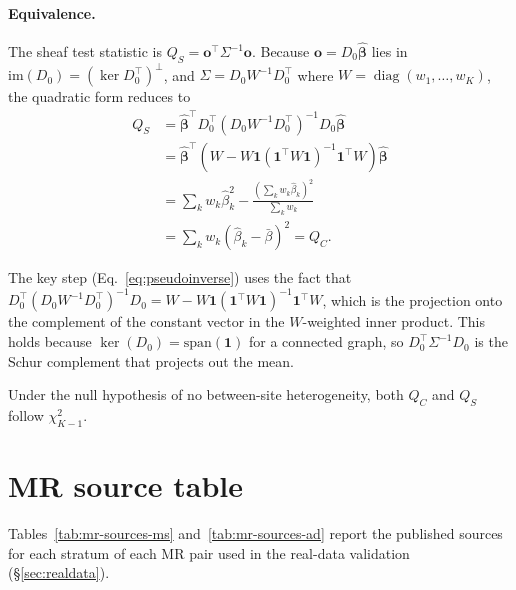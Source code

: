 \documentclass[11pt]{article}
\begin{document}
\paragraph{Equivalence.}
The sheaf test statistic is $Q_S = \mathbf{o}^\top \Sigma^{-1} \mathbf{o}$. Because $\mathbf{o} = D_0 \hat{\boldsymbol{\beta}}$ lies in $\mathrm{im}(D_0) = (\ker D_0^\top)^\perp$, and $\Sigma = D_0 W^{-1} D_0^\top$ where $W = \operatorname{diag}(w_1, \ldots, w_K)$, the quadratic form reduces to
\begin{align}
    Q_S &= \hat{\boldsymbol{\beta}}^\top D_0^\top (D_0 W^{-1} D_0^\top)^{-1} D_0 \hat{\boldsymbol{\beta}} \nonumber \\
        &= \hat{\boldsymbol{\beta}}^\top (W - W \mathbf{1}({\mathbf{1}}^\top W \mathbf{1})^{-1} {\mathbf{1}}^\top W) \hat{\boldsymbol{\beta}} \label{eq:pseudoinverse} \\
        &= \sum_k w_k \hat\beta_k^2 - \frac{(\sum_k w_k \hat\beta_k)^2}{\sum_k w_k} \nonumber \\
        &= \sum_k w_k (\hat\beta_k - \bar\beta)^2 = Q_C. \nonumber
\end{align}

The key step (Eq.~\ref{eq:pseudoinverse}) uses the fact that $D_0^\top (D_0 W^{-1} D_0^\top)^{-1} D_0 = W - W \mathbf{1}(\mathbf{1}^\top W \mathbf{1})^{-1} \mathbf{1}^\top W$, which is the projection onto the complement of the constant vector in the $W$-weighted inner product. This holds because $\ker(D_0) = \mathrm{span}(\mathbf{1})$ for a connected graph, so $D_0^\top \Sigma^{-1} D_0$ is the Schur complement that projects out the mean.

Under the null hypothesis of no between-site heterogeneity, both $Q_C$ and $Q_S$ follow $\chi^2_{K-1}$.

\section{MR source table}
\label{app:mr-sources}

Tables~\ref{tab:mr-sources-ms} and~\ref{tab:mr-sources-ad} report the published sources for each stratum of each MR pair used in the real-data validation (\S\ref{sec:realdata}).
\end{document}

